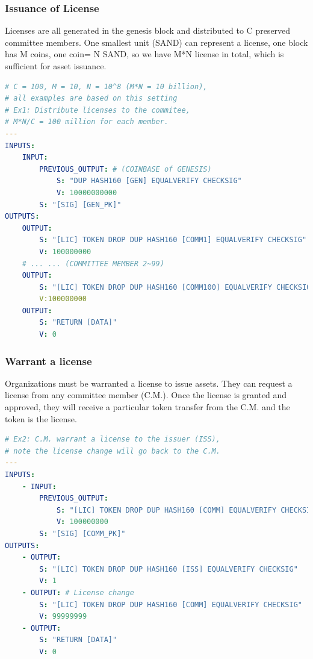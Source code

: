 \documentclass[a4paper,11pt]{article}
\begin{document}
\subsubsection{Issuance of License}

Licenses are all generated in the genesis block and distributed to C preserved committee members. One smallest unit (SAND) can represent a license, one block has M coins, one coin= N SAND, so we have M*N license in total, which is sufficient for asset issuance.


\begin{lstlisting}[language=yaml, numbers=none,basicstyle=\footnotesize]
# C = 100, M = 10, N = 10^8 (M*N = 10 billion), 
# all examples are based on this setting
# Ex1: Distribute licenses to the commitee, 
# M*N/C = 100 million for each member.
---	
INPUTS:
	INPUT:
		PREVIOUS_OUTPUT: # (COINBASE of GENESIS)
			S: "DUP HASH160 [GEN] EQUALVERIFY CHECKSIG"
			V: 10000000000 
		S: "[SIG] [GEN_PK]"
OUTPUTS:
	OUTPUT:
		S: "[LIC] TOKEN DROP DUP HASH160 [COMM1] EQUALVERIFY CHECKSIG"
		V: 100000000 
	# ... ... (COMMITTEE MEMBER 2~99)
	OUTPUT:
		S: "[LIC] TOKEN DROP DUP HASH160 [COMM100] EQUALVERIFY CHECKSIG"
		V:100000000
	OUTPUT:
		S: "RETURN [DATA]" 
		V: 0
\end{lstlisting}



\subsubsection{Warrant a license}

Organizations must be warranted a license to issue assets. They can request a license from any committee member (C.M.). Once the license is granted and approved, they will receive a particular token transfer from the C.M. and the token is the license.

\lstset{basicstyle=\tiny,style=myListStyle}
\begin{lstlisting}[language=yaml, numbers=none,basicstyle=\footnotesize]
# Ex2: C.M. warrant a license to the issuer (ISS), 
# note the license change will go back to the C.M.
---	
INPUTS:
	- INPUT:
		PREVIOUS_OUTPUT:
			S: "[LIC] TOKEN DROP DUP HASH160 [COMM] EQUALVERIFY CHECKSIG"
			V: 100000000
		S: "[SIG] [COMM_PK]"
OUTPUTS:
	- OUTPUT:
		S: "[LIC] TOKEN DROP DUP HASH160 [ISS] EQUALVERIFY CHECKSIG"
		V: 1
	- OUTPUT: # License change
		S: "[LIC] TOKEN DROP DUP HASH160 [COMM] EQUALVERIFY CHECKSIG"
		V: 99999999
	- OUTPUT:
		S: "RETURN [DATA]" 
		V: 0
\end{lstlisting}
\end{document}
